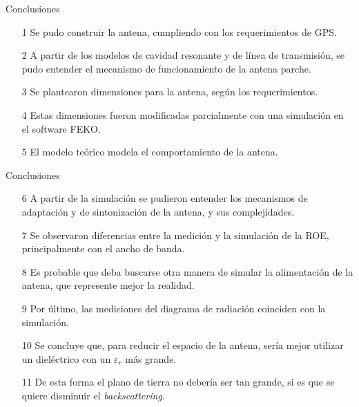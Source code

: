 \begin{frame}{Conclusiones}
    \begin{enumerate}[<+->]
        \item [1] Se pudo construir la antena, cumpliendo con los requerimientos de GPS.
        \item [2] A partir de los modelos de cavidad resonante y de línea de transmisión, se pudo entender el mecanismo de funcionamiento de la antena parche.
        \item [3] Se plantearon dimensiones para la antena, según los requerimientos.
        \item [4] Estas dimensiones fueron modificadas parcialmente con una simulación en el software FEKO.
        \item [5] El modelo teórico modela el comportamiento de la antena.
    \end{enumerate}
\end{frame}

\begin{frame}{Conclusiones}
    \begin{enumerate}[<+->]
        \item [6] A partir de la simulación se pudieron entender los mecanismos de adaptación y de sintonización de la antena, y sus complejidades.
        \item [7] Se observaron diferencias entre la medición y la simulación de la ROE, principalmente con el ancho de banda.
        \item [8] Es probable que deba buscarse otra manera de simular la alimentación de la antena, que represente mejor la realidad.
        \item [9] Por último, las mediciones del diagrama de radiación coinciden con la simulación.
        \item [10] Se concluye que, para reducir el espacio de la antena, sería mejor utilizar un dieléctrico con un $\varepsilon_r$ más grande.
        \item [11] De esta forma el plano de tierra no debería ser tan grande, si es que se quiere disminuir el \textit{backscattering}.
    \end{enumerate}
\end{frame}